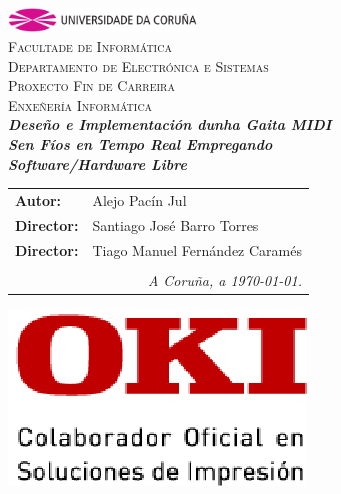 \begin{titlepage}
\begin{center}
\includegraphics[width=5cm]{imagenes/anagramaUDC.png}\\[0.5cm]
{\textsc{Facultade de Informática}} \\
{\large \textsc{Departamento de Electrónica e Sistemas}} \\[1cm]
{\Large \textsc{Proxecto Fin de Carreira}} \\
{\Large \textsc{Enxeñería Informática}} \\[2cm]
{\Large \textsl{\textbf{Deseño e Implementación dunha Gaita MIDI}}} \\[0.15cm]
{\Large \textsl{\textbf{Sen Fíos en Tempo Real Empregando}}} \\
{\Large \textsl{\textbf{Software/Hardware Libre}}} \\
\vfill
\begin{flushright}
\begin{tabular}{ll}
\textbf{Autor:}    & Alejo Pacín Jul \\
\textbf{Director:} & Santiago José Barro Torres \\
\textbf{Director:} & Tiago Manuel Fernández Caramés \\
& \\
\multicolumn{2}{r}{\small \emph{A Coruña, a \today{}.}} \\
\end{tabular}
\end{flushright}
\begin{flushleft}
 \includegraphics[scale=0.4,keepaspectratio=true]{./imagenes/oki.png}
\end{flushleft}
\end{center}
\end{titlepage}
